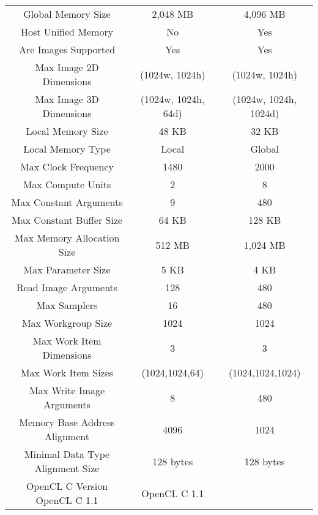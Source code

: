 \begin{tabular}{|c|c|c|}
Global Memory Size     &           2,048 MB            &              4,096 MB            \\              
Host Unified Memory       &        No                 &               Yes                               \\
Are Images Supported       &       Yes                 &              Yes                               \\
Max Image 2D Dimensions     &      (1024w, 1024h)       &             (1024w, 1024h)            \\        
Max Image 3D Dimensions      &     (1024w, 1024h, 64d)  &             (1024w, 1024h, 1024d)      \\       
Local Memory Size       &          48 KB             &                32 KB                             \\
Local Memory Type        &         Local             &                Global               \\             
Max Clock Frequency       &        1480              &                2000                              \\
Max Compute Units        &         2                 &                8                                 \\
Max Constant Arguments       &     9                 &                480                               \\
Max Constant Buffer Size      &    64 KB             &                128 KB    \\                        
Max Memory Allocation Size     &   512 MB            &                1,024 MB        \\                  
Max Parameter Size        &        5 KB              &                4 KB                              \\
Read Image Arguments     &         128               &                480                               \\
Max Samplers              &        16                &                480                               \\
Max Workgroup Size       &         1024              &                1024                              \\
Max Work Item Dimensions     &     3                 &                3                                 \\
Max Work Item Sizes       &        (1024,1024,64)                   & (1024,1024,1024)         \\         
Max Write Image Arguments    &     8                    &             480                               \\
Memory Base Address Alignment  &   4096                 &             1024                              \\
Minimal Data Type Alignment Size & 128 bytes           &              128 bytes               \\          
OpenCL C Version                  OpenCL C 1.1        &              OpenCL C 1.1                       \\
\hline 
\end{tabular} 